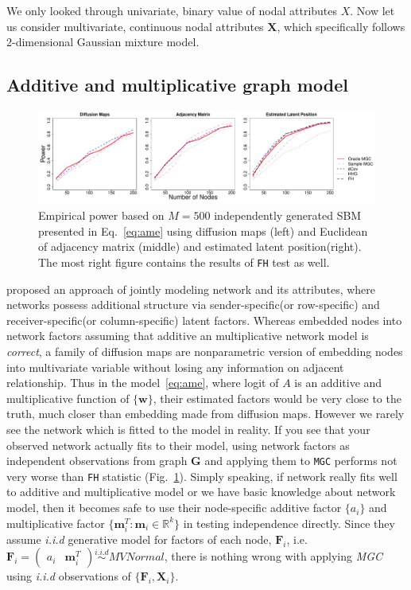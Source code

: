 \documentclass[12pt]{article}
\theoremstyle{definition}
\begin{document}
We only looked through univariate, binary value of nodal attributes $X$. Now let us consider multivariate, continuous nodal attributes $\mathbf{X}$, which specifically follows 2-dimensional Gaussian mixture model. 


	
\subsection{Additive and multiplicative graph model}

\begin{figure}[h]
	\centering
	\includegraphics[width=7in]{../Figure/ame.pdf}
	\caption{Empirical power based on $M = 500$ independently generated SBM presented in Eq.~\ref{eq:ame} using diffusion maps (left) and Euclidean of adjacency matrix (middle)  and estimated latent position(right). The most right figure contains the results of \texttt{FH} test as well.}
		\label{fig:ame}
\end{figure}

\cite{hoff2002latent} proposed an approach of jointly modeling network and its attributes, where networks possess additional structure via sender-specific(or row-specific) and receiver-specific(or column-specific) latent factors. Whereas \cite{fosdick2015testing} embedded nodes into network factors assuming that additive an multiplicative network model is \textit{correct}, a family of diffusion maps are nonparametric version of embedding nodes into multivariate variable without losing any information on adjacent relationship. Thus in the model~\ref{eq:ame}, where logit of $A$ is an additive and multiplicative function of $\{\mathbf{w} \}$, their estimated factors would be very close to the truth, much closer than embedding made from diffusion maps. However we rarely see the network which is fitted to the model in reality. If you see that your observed network actually fits to their model, using network factors as independent observations from graph $\mathbf{G}$ and applying them to \texttt{MGC} performs not very worse than \texttt{FH} statistic (Fig.~\ref{fig:ame}).
Simply speaking, if network really fits well to additive and multiplicative model or we have basic knowledge about network model, then it becomes safe to use their node-specific additive factor $\{ a_{i} \}$ and multiplicative factor $\{ \mathbf{m}^{T}_{i} : \mathbf{m}_{i} \in \mathbb{R}^{k} \}$ in testing independence directly. Since they assume \textit{i.i.d} generative model for factors of each node, $\mathbf{F}_{i}$, i.e. $\mathbf{F}_{i} = \begin{pmatrix} a_{i} & \mathbf{m}^{T}_{i} \end{pmatrix} \overset{i.i.d}{\sim} MVNormal$, there is nothing wrong with applying \textit{MGC} using \textit{i.i.d} observations of $\{ \mathbf{F}_{i}, \mathbf{X}_{i} \}$.   
	
\end{document}

